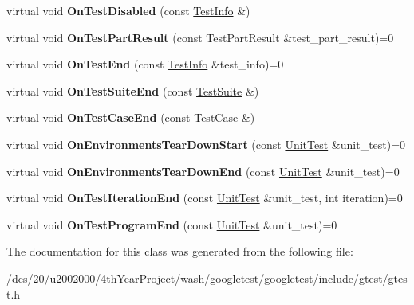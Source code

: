 \begin{DoxyCompactItemize}
\item 
\mbox{\label{classtesting_1_1TestEventListener_a3696d7f4713eff0d096bfebff626fb50}} 
virtual void {\bfseries On\+Test\+Disabled} (const \mbox{\hyperlink{classtesting_1_1TestInfo}{Test\+Info}} \&)
\item 
\mbox{\label{classtesting_1_1TestEventListener_a054f8705c883fa120b91473aff38f2ee}} 
virtual void {\bfseries On\+Test\+Part\+Result} (const Test\+Part\+Result \&test\+\_\+part\+\_\+result)=0
\item 
\mbox{\label{classtesting_1_1TestEventListener_abb1c44525ef038500608b5dc2f17099b}} 
virtual void {\bfseries On\+Test\+End} (const \mbox{\hyperlink{classtesting_1_1TestInfo}{Test\+Info}} \&test\+\_\+info)=0
\item 
\mbox{\label{classtesting_1_1TestEventListener_a8962caad5d2522c9160c794074a662ee}} 
virtual void {\bfseries On\+Test\+Suite\+End} (const \mbox{\hyperlink{classtesting_1_1TestSuite}{Test\+Suite}} \&)
\item 
\mbox{\label{classtesting_1_1TestEventListener_a6cada1572dde8010b94f6dd237ce52f4}} 
virtual void {\bfseries On\+Test\+Case\+End} (const \mbox{\hyperlink{classtesting_1_1TestSuite}{Test\+Case}} \&)
\item 
\mbox{\label{classtesting_1_1TestEventListener_a468b5e6701bcb86cb2c956caadbba5e4}} 
virtual void {\bfseries On\+Environments\+Tear\+Down\+Start} (const \mbox{\hyperlink{classtesting_1_1UnitTest}{Unit\+Test}} \&unit\+\_\+test)=0
\item 
\mbox{\label{classtesting_1_1TestEventListener_a9ea04fa7f447865ba76df35e12ba2092}} 
virtual void {\bfseries On\+Environments\+Tear\+Down\+End} (const \mbox{\hyperlink{classtesting_1_1UnitTest}{Unit\+Test}} \&unit\+\_\+test)=0
\item 
\mbox{\label{classtesting_1_1TestEventListener_a550fdb3e55726e4cefa09f5697941425}} 
virtual void {\bfseries On\+Test\+Iteration\+End} (const \mbox{\hyperlink{classtesting_1_1UnitTest}{Unit\+Test}} \&unit\+\_\+test, int iteration)=0
\item 
\mbox{\label{classtesting_1_1TestEventListener_ad15b6246d94c268e233487a86463ef3d}} 
virtual void {\bfseries On\+Test\+Program\+End} (const \mbox{\hyperlink{classtesting_1_1UnitTest}{Unit\+Test}} \&unit\+\_\+test)=0
\end{DoxyCompactItemize}


The documentation for this class was generated from the following file\+:\begin{DoxyCompactItemize}
\item 
/dcs/20/u2002000/4th\+Year\+Project/wash/googletest/googletest/include/gtest/gtest.\+h\end{DoxyCompactItemize}
